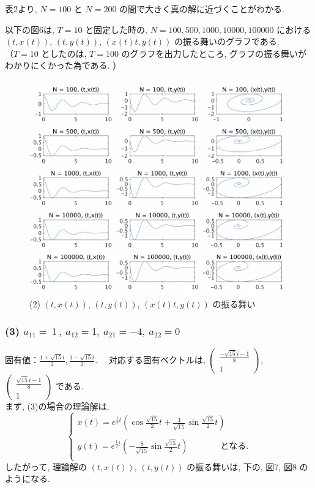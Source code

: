 \documentclass[11pt]{jsarticle}
\begin{document}
表2より, $N = 100$ と $N = 200$ の間で大きく真の解に近づくことがわかる. \par
以下の図6は, $T = 10$ と固定した時の, $N = 100, 500, 1000, 10000, 100000$ における $(t, x(t))$, $(t, y(t))$, $(x(t)t, y(t))$ の振る舞いのグラフである. \\
（$T = 10$ としたのは, $T = 100$ のグラフを出力したところ, グラフの振る舞いがわかりにくかった為である. ）
\begin{figure}[htbp]
\centering
\includegraphics[width=15cm]{images/2_matlab.png}
\caption{(2) $(t, x(t))$, $(t, y(t))$, $(x(t)t, y(t))$ の振る舞い}
\end{figure}

\clearpage
\subsubsection{(3) $a_{11} = \ 1\ , \ a_{12} = 1, \ a_{21} = -4, \ a_{22} = 0$}
固有値：$\displaystyle \frac{1+\sqrt{15}i}{2}, \frac{1-\sqrt{15}i}{2}$. \ \ 対応する固有ベクトルは, $\begin{pmatrix} \frac{-\sqrt{15}i-1}{8} \\ 1 \end{pmatrix}$, $\begin{pmatrix} \frac{\sqrt{15}i-1}{8} \\ 1 \end{pmatrix}$ である. \\
まず, (3)の場合の理論解は, 
\[\left\{ 
\begin{array}{l}
\displaystyle x(t) = e^{\frac{1}{2}t}\left( \cos{\frac{\sqrt{15}}{2}t} + \frac{1}{\sqrt{15}}\sin{\frac{\sqrt{15}}{2}t}\right) \\ \\
\displaystyle y(t) = e^{\frac{1}{2}t}\left(-\frac{8}{\sqrt{15}}\sin{\frac{\sqrt{15}}{2}t}\right) \ \ \ \ \ \ \ \ \ \ \ \ \ \ \ \ \ となる. \\
\end{array}
\right. \]
したがって, 理論解の $(t, x(t))$, $(t, y(t))$ の振る舞いは, 下の, 図7, 図8 のようになる. 
\end{document}
